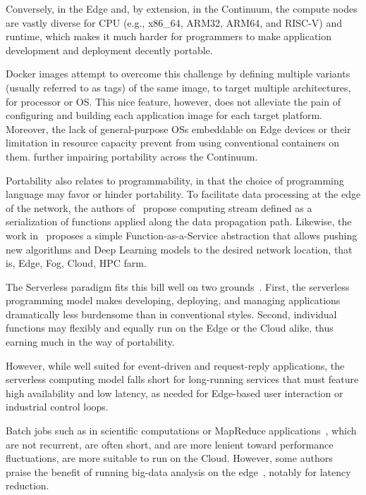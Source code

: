Conversely, in the Edge and, by extension, in the Continuum, the compute nodes are vastly diverse for CPU (e.g., x86\_64, ARM32, ARM64, and RISC-V) and runtime, which makes it much harder for programmers to make application development and deployment decently portable. 

Docker images attempt to overcome this challenge by defining multiple variants (usually referred to as tags) of the same image, to target multiple architectures, for processor or OS. 
This nice feature, however, does not alleviate the pain of configuring and building each application image for each target platform. Moreover, the lack of general-purpose OSs embeddable on Edge devices or their limitation in resource capacity prevent from using conventional containers on them. further impairing portability across the Continuum.

Portability also relates to programmability, in that the choice of programming language may favor or hinder portability. 
To facilitate data processing at the edge of the network, the authors of~\cite{shi2016edge} propose computing stream defined as a serialization of functions applied along the data propagation path. Likewise, the work in~\cite{beckman2020harnessing} proposes a simple Function-as-a-Service abstraction that allows pushing new algorithms and Deep Learning models to the desired network location, that is, Edge, Fog, Cloud, HPC farm.

The Serverless paradigm fits this bill well on two grounds~\cite{yi2017lavea}. First, the serverless programming model makes  developing, deploying, and managing applications dramatically less burdensome than in conventional styles.
Second, individual functions may flexibly and equally run on the Edge or the Cloud alike, thus earning much in the way of portability.

However, while well suited for event-driven and request-reply applications, the serverless computing model falls short for long-running services that must feature high availability and low latency, as needed for Edge-based user interaction or industrial control loops.
 
Batch jobs such as in scientific computations or MapReduce applications~\cite{condie2010mapreduce}, which are not recurrent, are often short, and are more lenient toward performance fluctuations, are more suitable to run on the Cloud. 
However, some authors praise the benefit of running big-data analysis on the edge~\cite{he2017multitier}, notably for latency reduction.

